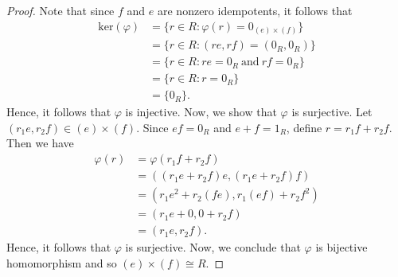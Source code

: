 \documentclass[a4paper]{article}
\begin{document}
\begin{problem}
\begin{enumerate}
\begin{proof}
            Note that since \( f  \) and \( e  \) are nonzero idempotents, it follows that 
            \begin{align*}
                \text{ker}(\varphi) &= \{ r \in R : \varphi(r) = 0_{(e) \times (f)} \}  \\
                                    &= \{ r \in R : (re, rf) = ({0}_{R}, {0}_{R}) \}  \\
                                    &= \{ r \in R : re = {0}_{R} \ \text{and} \ rf = {0}_{R} \}  \\
                                    &= \{ r \in R : r = {0}_{R} \} \\
                                    &= \{ {0}_{R} \}.
            \end{align*}
            Hence, it follows that \( \varphi \) is injective. Now, we show that \( \varphi  \) is surjective. Let \( ({r}_{1}e, {r}_{2}f) \in (e) \times (f) \). Since \( ef = {0}_{R}  \) and \( e + f  =  {1}_{R}\), define \( r = {r}_{1} f + {r}_{2} f  \). Then we have 
            \begin{align*}
                \varphi(r) &= \varphi({r}_{1}f + {r}_{2}f)  \\
                           &= (({r}_{1}e + {r}_{2}f)e, ({r}_{1}e + {r}_{2}f) f ) \\
                           &= ({r}_{1}e^{2} + {r}_{2} (fe) , {r}_{1} (ef) + {r}_{2} f^{2}) \\
                           &= ({r}_{1}e + 0, 0 + {r}_{2}f) \\
                           &= ({r}_{1}e, {r}_{2}f). 
            \end{align*}
            Hence, it follows that \( \varphi  \) is surjective. Now, we conclude that \( \varphi  \) is bijective homomorphism and so \( (e) \times (f) \cong R  \).

            \end{proof}
   \end{enumerate}
\end{problem}
\end{document}
